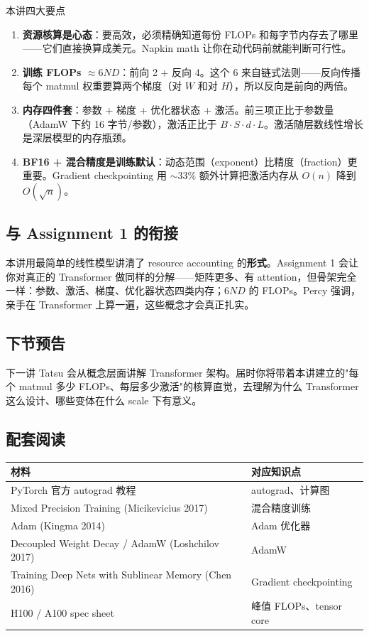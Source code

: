 \documentclass[a4paper]{article}
\begin{document}
\begin{importantbox}{本讲四大要点}
\begin{enumerate}
\item \textbf{资源核算是心态}：要高效，必须精确知道每份 FLOPs 和每字节内存去了哪里——它们直接换算成美元。Napkin math 让你在动代码前就能判断可行性。
\item \textbf{训练 FLOPs $\approx 6ND$}：前向 2 + 反向 4。这个 6 来自链式法则——反向传播每个 matmul 权重要算两个梯度（对 $W$ 和对 $H$），所以反向是前向的两倍。
\item \textbf{内存四件套}：参数 + 梯度 + 优化器状态 + 激活。前三项正比于参数量（AdamW 下约 16 字节/参数），激活正比于 $B \cdot S \cdot d \cdot L$。激活随层数线性增长是深层模型的内存瓶颈。
\item \textbf{BF16 + 混合精度是训练默认}：动态范围（exponent）比精度（fraction）更重要。Gradient checkpointing 用 $\sim 33\%$ 额外计算把激活内存从 $O(n)$ 降到 $O(\sqrt{n})$。
\end{enumerate}
\end{importantbox}

\subsection{与 Assignment 1 的衔接}

本讲用最简单的线性模型讲清了 resource accounting 的\textbf{形式}。Assignment 1 会让你对真正的 Transformer 做同样的分解——矩阵更多、有 attention，但骨架完全一样：参数、激活、梯度、优化器状态四类内存；$6ND$ 的 FLOPs。Percy 强调，亲手在 Transformer 上算一遍，这些概念才会真正扎实。

\subsection{下节预告}

下一讲 Tatsu 会从概念层面讲解 Transformer 架构。届时你将带着本讲建立的"每个 matmul 多少 FLOPs、每层多少激活"的核算直觉，去理解为什么 Transformer 这么设计、哪些变体在什么 scale 下有意义。

\subsection{配套阅读}

\begin{tabular}{p{7cm}p{6cm}}
\toprule
\textbf{材料} & \textbf{对应知识点} \\
\midrule
PyTorch 官方 autograd 教程 & autograd、计算图 \\
Mixed Precision Training (Micikevicius 2017) & 混合精度训练 \\
Adam (Kingma 2014) & Adam 优化器 \\
Decoupled Weight Decay / AdamW (Loshchilov 2017) & AdamW \\
Training Deep Nets with Sublinear Memory (Chen 2016) & Gradient checkpointing \\
H100 / A100 spec sheet & 峰值 FLOPs、tensor core \\
\bottomrule
\end{tabular}

\end{document}
